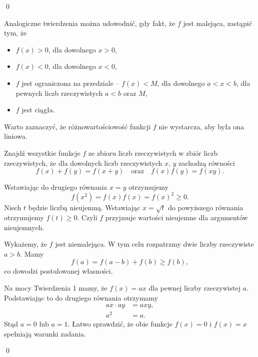 \qed

\newpage
\noindent
Analogiczne twierdzenia można udowodnić, gdy fakt, że $f$ jest malejąca, zastąpić tym, że 
\begin{itemize}
	\item $f(x) > 0$, dla dowolnego $x > 0$,
	\item $f(x) < 0$, dla dowolnego $x < 0$,
	\item $f$ jest ograniczona na przedziale -- $f(x) < M$, dla dowolnego $a < x < b$, dla pewnych liczb rzeczywistych $a < b$ oraz $M$,
	\item $f$ jest ciągła.
\end{itemize}
Warto zaznaczyć, że różnowartościowość funkcji $f$ nie wystarcza, aby była ona liniowa. 


\vspace{10px}


\noindent
Znajdź wszystkie funkcje $f$ ze zbioru liczb rzeczywistych w zbiór liczb rzeczywistych, że dla dowolnych liczb rzeczywistych $x$, $y$ zachodzą równości
\[ 
	f(x) + f(y) = f(x + y) \quad \text{oraz} \quad f(x)f(y) = f(xy).
\]

\vspace{5px}


\noindent
Wstawiając do drugiego równania $x = y$ otrzymujemy
\[
	f(x^2) = f(x)f(x) = f(x)^2 \geqslant 0.
\]
Niech $t$ będzie liczbą nieujemną. Wstawiając $x = \sqrt{t}$ do powyższego równania otrzymujemy $f(t) \geqslant 0$. Czyli $f$ przyjmuje wartości nieujemne dla argumentów nieujemnych.

\vspace{10px}
\noindent
Wykażemy, że $f$ jest niemalejąca. W tym celu rozpatrzmy dwie liczby rzeczywiste $a > b$. Mamy
\[
	f(a) = f(a - b) + f(b) \geqslant f(b),
\]
co dowodzi postulowanej własności.

\vspace{10px}
\noindent
Na mocy Twierdzenia 1 mamy, że $f(x) = ax$ dla pewnej liczby rzeczywistej $a$. Podstawiając to do drugiego równania otrzymamy
\begin{align*}
	ax \cdot ay &= axy, \\
	a^2 &= a.
\end{align*}
Stąd $a = 0$ lub $a = 1$. Łatwo sprawdzić, że obie funkcje $f(x) = 0$ i $f(x) = x$ spełniają warunki zadania.

\qed

